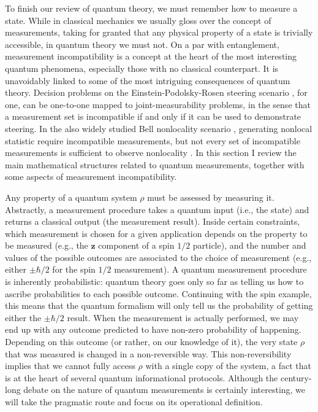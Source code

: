		To finish our review of quantum theory, we must remember how to measure a state. While in classical mechanics we usually gloss over the concept of measurements, taking for granted that any physical property of a state is trivially accessible, in quantum theory we must not. On a par with entanglement, measurement incompatibility is a concept at the heart of the most interesting quantum phenomena, especially those with no classical counterpart. It is unavoidably linked to some of the most intriguing consequences of quantum theory. Decision problems on the Einstein-Podolsky-Rosen steering scenario \cite{uola_2020_steering,cavalcanti_2016_steering}, for one, can be one-to-one mapped to joint-measurability problems, in the sense that a measurement set is incompatible if and only if it can be used to demonstrate steering. In the also widely studied Bell nonlocality scenario \cite{brunner_2014_nonlocality}, generating nonlocal statistic require incompatible measurements, but not every set of incompatible measurements is sufficient to observe nonlocality \cite{quintino_2016_incompatibilitybell,quintino_2018_incompatibilitybellgeneral,bene_2018_incompatibilitybell}. In this section I review the main mathematical structures related to quantum measurements, together with some aspects of measurement incompatibility.
	
		Any property of a quantum system $\rho$ must be assessed by measuring it. Abstractly, a measurement procedure takes a quantum input (i.e., the state) and returns a classical output (the measurement result). Inside certain constraints, which measurement is chosen for a given application depends on the property to be measured (e.g., the $\mathbf{z}$ component of a spin $1/2$ particle), and the number and values of the possible outcomes are associated to the choice of measurement (e.g., either $\pm \hbar/2$ for the spin $1/2$ measurement). A quantum measurement procedure is inherently probabilistic: quantum theory goes only so far as telling us how to ascribe probabilities to each possible outcome. Continuing with the spin example, this means that the quantum formalism will only tell us the probability of getting either the $\pm \hbar/2$ result. When the measurement is actually performed, we may end up with any outcome predicted to have non-zero probability of happening. Depending on this outcome (or rather, on our knowledge of it), the very state $\rho$ that was measured is changed in a non-reversible way. This non-reversibility implies that we cannot fully access $\rho$ with a single copy of the system, a fact that is at the heart of several quantum informational protocols. Although the century-long debate on the nature of quantum measurements is certainly interesting, we will take the pragmatic route and focus on its operational definition.
		

